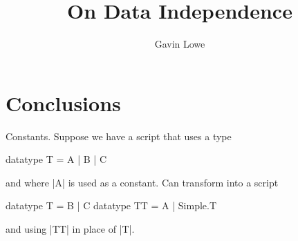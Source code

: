 \documentclass[12pt,a4paper]{article}
\title{On Data Independence}
\author{Gavin Lowe}
\begin{document}
\maketitle










\section{Conclusions}

Constants.  Suppose we have a script that uses a type
\begin{cspm}
datatype T = A | B | C
\end{cspm}
and where |A| is used as a constant.
Can transform into a script 
\begin{cspm}
datatype T = B | C
datatype TT = A | Simple.T
\end{cspm}
and using |TT| in place of |T|.


\appendix
%
%




\end{document}
